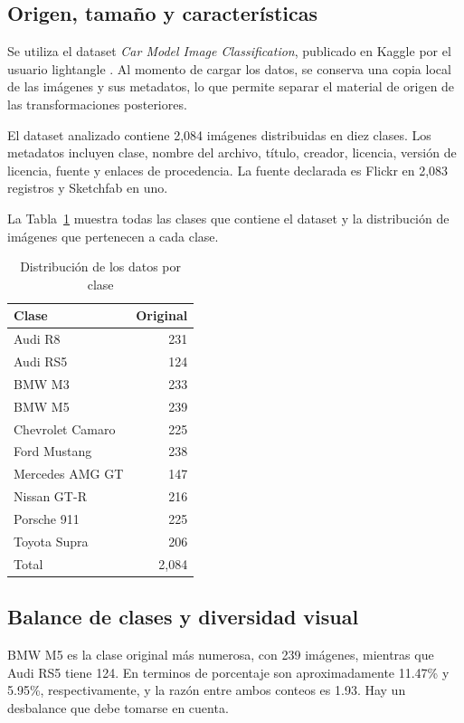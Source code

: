 \documentclass[conference]{IEEEtran}
\begin{document}
\subsection{Origen, tamaño y características}

Se utiliza el dataset \textit{Car Model Image Classification}, publicado en Kaggle por el usuario lightangle \citep{dataset}. Al momento de cargar los datos, se conserva una copia local de las imágenes y sus metadatos, lo que permite separar el material de origen de las transformaciones posteriores.

El dataset analizado contiene 2,084 imágenes distribuidas en diez clases. Los metadatos incluyen clase, nombre del archivo, título, creador, licencia, versión de licencia, fuente y enlaces de procedencia. La fuente declarada es Flickr en 2,083 registros y Sketchfab en uno.

La Tabla~\ref{tab:distribucion} muestra todas las clases que contiene el dataset y la distribución de imágenes que pertenecen a cada clase.

\begin{table}[!htbp]
\caption{Distribución de los datos por clase}
\label{tab:distribucion}
\centering
\scriptsize
\setlength{\tabcolsep}{3pt}
\begin{tabular}{lr}
\toprule
Clase & Original \\
\midrule
Audi R8 & 231 \\
Audi RS5 & 124 \\
BMW M3 & 233 \\
BMW M5 & 239 \\
Chevrolet Camaro & 225  \\
Ford Mustang & 238 \\
Mercedes AMG GT & 147 \\
Nissan GT-R & 216 \\
Porsche 911 & 225 \\
Toyota Supra & 206 \\
\midrule
Total & 2,084 \\
\bottomrule
\end{tabular}
\par\smallskip
\end{table}

\subsection{Balance de clases y diversidad visual}

BMW M5 es la clase original más numerosa, con 239 imágenes, mientras que Audi RS5 tiene 124. En terminos de porcentaje son aproximadamente 11.47\% y 5.95\%, respectivamente, y la razón entre ambos conteos es 1.93. Hay un desbalance que debe tomarse en cuenta.
\end{document}
